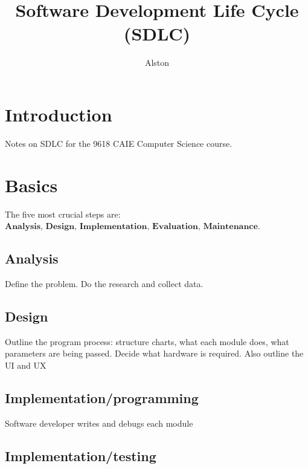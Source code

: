 \documentclass{article}
\title{Software Development Life Cycle (SDLC)}
\author{Alston}
\date{}
\theoremstyle{mytheoremstyle}
\theoremstyle{mytheoremstyle}
\theoremstyle{myproblemstyle}
\begin{document}
    \maketitle

    \section{Introduction}
    Notes on SDLC for the 9618 CAIE Computer Science course.

    \section{Basics}
    The five most crucial steps are: $\textbf{Analysis, Design, Implementation, Evaluation, Maintenance}$.

    \subsection{Analysis}
    Define the problem. Do the research and collect data. 

    \subsection{Design}
    Outline the program process: structure charts, what each module does, what parameters are being passed. Decide what hardware is required. Also outline the UI and UX

    \subsection{Implementation/programming}
    Software developer writes and debugs each module

    \subsection{Implementation/testing}
\end{document}

